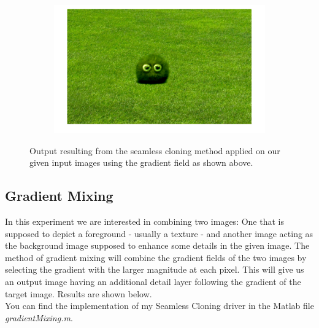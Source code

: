 \documentclass{paper}
\begin{document}
\begin{figure}[H]
    \centering
    \begin{subfigure}{1.0\textwidth}
        \includegraphics[width=\textwidth]{../../outputs/p4/seamless_cloning/monster/output}
    \end{subfigure}
    \caption{Output resulting from the seamless cloning method applied on our given input images using the gradient field as shown above.}
    \label{fig:seamless_cloning_monster_out}       
\end{figure}


\subsection{Gradient Mixing}

In this experiment we are interested in combining two images: One that is supposed to depict a foreground - usually a texture - and another image acting as the background image supposed to enhance some details in the given image. The method of gradient mixing will combine the gradient fields of the two images by selecting the gradient with the larger magnitude at each pixel. This will give us an output image having an additional detail layer following the gradient of the target image. Results are shown below. \\

You can find the implementation of my Seamless Cloning driver in the Matlab file \emph{gradientMixing.m}.
\end{document}
